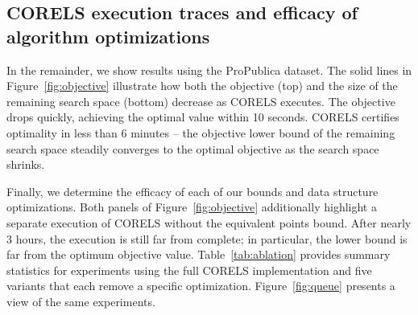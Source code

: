 \subsection{CORELS execution traces and efficacy of algorithm optimizations}

In the remainder, we show results using the ProPublica dataset.
%
The solid lines in Figure~\ref{fig:objective} illustrate how both the objective (top)
and the size of the remaining search space (bottom) decrease as CORELS executes.
%
The objective drops quickly, achieving the optimal value within 10 seconds.
CORELS certifies optimality in less than 6 minutes --
the objective lower bound of the remaining search space
steadily converges to the optimal objective as the search space shrinks.

Finally, we determine the efficacy of each of our bounds and data structure optimizations.
%
Both panels of Figure~\ref{fig:objective} additionally highlight a separate
execution of CORELS without the equivalent points bound.
%
After nearly 3 hours, the execution is still far from complete;
in particular, the lower bound is far from the optimum objective value.
%
Table~\ref{tab:ablation} provides summary statistics for experiments using the full
CORELS implementation and five variants that each remove a specific optimization.
%
Figure~\ref{fig:queue} presents a view of the same experiments.
%
